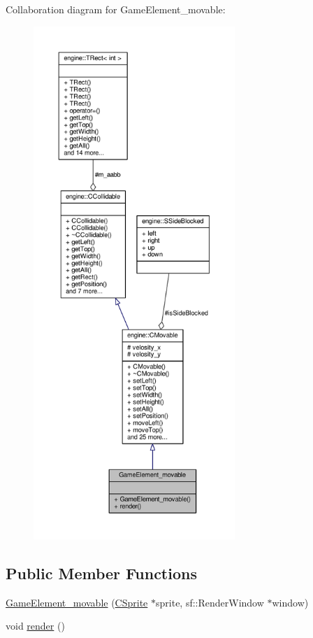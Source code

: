 Collaboration diagram for Game\-Element\-\_\-movable\-:\nopagebreak
\begin{figure}[H]
\begin{center}
\leavevmode
\includegraphics[height=550pt]{classGameElement__movable__coll__graph}
\end{center}
\end{figure}
\subsection*{Public Member Functions}
\begin{DoxyCompactItemize}
\item 
\hyperlink{classGameElement__movable_ac9009600530046f90e75ebcea411d907}{Game\-Element\-\_\-movable} (\hyperlink{classCSprite}{C\-Sprite} $\ast$sprite, sf\-::\-Render\-Window $\ast$window)
\item 
void \hyperlink{classGameElement__movable_a503e47a89c65d149529a3af6dc1064a1}{render} ()
\end{DoxyCompactItemize}
